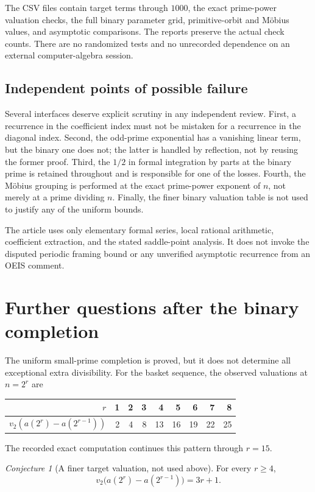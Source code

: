 \documentclass[11pt,a4paper]{article}
\numberwithin{equation}{section}
\theoremstyle{definition}
\theoremstyle{remark}
\newtheorem{conjecture}[theorem]{Conjecture}
\begin{document}
The CSV files contain target terms through $1000$, the exact prime-power
valuation checks, the full binary parameter grid, primitive-orbit and
M\"obius values, and asymptotic comparisons. The reports preserve the actual
check counts. There are no randomized tests and no unrecorded dependence on
an external computer-algebra session.

\subsection{Independent points of possible failure}
Several interfaces deserve explicit scrutiny in any independent review.
First, a recurrence in the coefficient index must not be mistaken for a
recurrence in the diagonal index. Second, the odd-prime exponential has a
vanishing linear term, but the binary one does not; the latter is handled
by reflection, not by reusing the former proof. Third, the $1/2$ in formal
integration by parts at the binary prime is retained throughout and is
responsible for one of the losses. Fourth, the Möbius grouping is performed
at the exact prime-power exponent of $n$, not merely at a prime dividing
$n$. Finally, the finer binary valuation table is not used to justify any
of the uniform bounds.

The article uses only elementary formal series, local rational arithmetic,
coefficient extraction, and the stated saddle-point analysis. It does not
invoke the disputed periodic framing bound or any unverified asymptotic
recurrence from an OEIS comment.

\section{Further questions after the binary completion}
\label{sec:frontiers}

The uniform small-prime completion is proved, but it does not determine
all exceptional extra divisibility. For the basket sequence, the observed
valuations at $n=2^r$ are
\begin{center}
\begin{tabular}{r r r r r r r r r}
\toprule
$r$&1&2&3&4&5&6&7&8\\
\midrule
$v_2(a(2^r)-a(2^{r-1}))$&2&4&8&13&16&19&22&25\\
\bottomrule
\end{tabular}
\end{center}
The recorded exact computation continues this pattern through $r=15$.

\begin{conjecture}[A finer target valuation, not used above]\label{conj:finer}
For every $r\ge4$,
\[
 v_2\bigl(a(2^r)-a(2^{r-1})\bigr)=3r+1.
\]
\end{conjecture}
\end{document}

